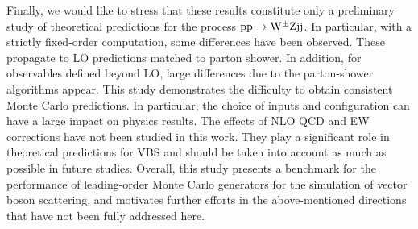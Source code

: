 \documentclass[11pt]{cernrep}
\begin{document}
Finally, we would like to stress that these results constitute only a preliminary study of theoretical predictions for the process ${\rm p}{\rm p} \to {\rm W}^{\pm}{\rm Z}{\rm j}{\rm j}$.
In particular, with a strictly fixed-order computation, some differences have been observed.
These propagate to LO predictions matched to parton shower.
In addition, for observables defined beyond LO, large differences due to the parton-shower algorithms appear.
This study demonstrates the difficulty to obtain consistent Monte Carlo predictions.
In particular, the choice of inputs and configuration can have a large impact on physics results.
The effects of NLO QCD and EW corrections have not been studied in this work.
They play a significant role in theoretical predictions for VBS and should be taken into account as much as possible in future studies.
Overall, this study presents a benchmark for the performance of leading-order Monte Carlo generators 
for the simulation of vector boson scattering, and motivates further efforts in the above-mentioned directions that have not 
been fully addressed here.


\end{document}
